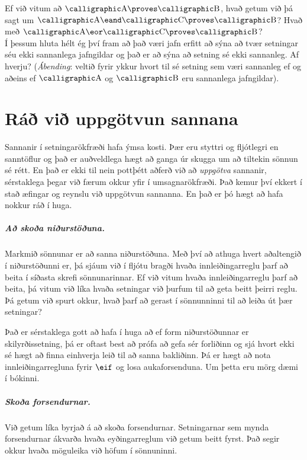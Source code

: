 \problempart
Ef við vitum að $\meta{A} \proves \meta{B}$, hvað getum við þá sagt um $\meta{A} \eand \meta{C} \proves \meta{B}$? Hvað með $\meta{A} \eor \meta{C} \proves \meta{B}$?
\\

\problempart Í þessum hluta hélt ég því fram að það væri jafn erfitt að sýna að tvær setningar séu ekki sannanlega jafngildar og það er að sýna að setning sé ekki sannanleg. Af hverju? (\emph{Ábending}: veltið fyrir ykkur hvort til sé setning sem væri sannanleg ef og aðeins ef $\meta{A}$ og $\meta{B}$ eru sannanlega jafngildar).


\chapter{Ráð við uppgötvun sannana}

Sannanir í setningarökfræði hafa ýmsa kosti. Þær eru styttri og fljótlegri en sanntöflur og það er auðveldlega hægt að ganga úr skugga um að tiltekin sönnun sé rétt. En það er ekki til nein pottþétt aðferð við að \emph{uppgötva} sannanir, sérstaklega þegar við færum okkur yfir í umsagnarökfræði. Það kemur því ekkert í stað æfingar og reynslu við uppgötvun sannanna. En það er þó hægt að hafa nokkur ráð í huga. 

\paragraph{Að skoða niðurstöðuna.}
Markmið sönnunar er að sanna niðurstöðuna. Með því að athuga hvert aðaltengið í niðurstöðunni er, þá sjáum við í fljótu bragði hvaða innleiðingarreglu þarf að beita í síðasta skrefi sönnunarinnar. Ef við vitum hvaða innleiðingarreglu þarf að beita, þá vitum við líka hvaða setningar við þurfum til að geta beitt þeirri reglu. Þá getum við spurt okkur, hvað þarf að gerast í sönnunninni til að leiða út þær setningar? 

Það er sérstaklega gott að hafa í huga að ef form niðurstöðunnar er skilyrðissetning, þá er oftast best að prófa að gefa sér forliðinn og sjá hvort ekki sé hægt að finna einhverja leið til að sanna bakliðinn. Þá er hægt að nota innleiðingarregluna fyrir $\eif$ og losa aukaforsenduna. Um þetta eru mörg dæmi í bókinni.

\paragraph{Skoða forsendurnar.}
Við getum líka byrjað á að skoða forsendurnar. Setningarnar sem mynda forsendurnar ákvarða hvaða eyðingarreglum við getum beitt fyrst. Það segir okkur hvaða möguleika við höfum í sönnuninni.

